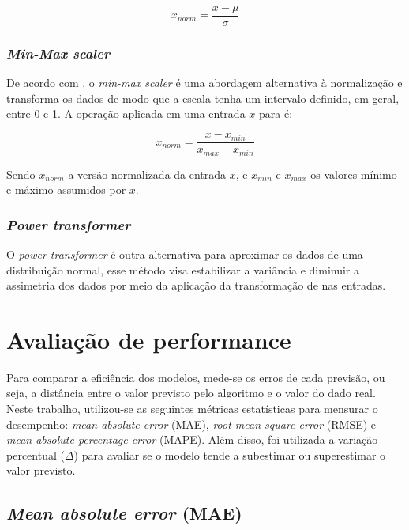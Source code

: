\begin{equation}
  x_{norm} = \frac{x - \mu}{\sigma}
\end{equation}

\subsubsection{\textit{Min-Max scaler}}

De acordo com \citet{Raschka}, o \textit{min-max scaler} é uma 
abordagem alternativa à normalização 
e transforma os dados de modo que a 
escala tenha um intervalo definido, em geral, entre
0 e 1. A operação aplicada em uma entrada $x$ para é:

\begin{equation}
  x_{norm} = \frac{x - x_{min}}{x_{max} - x_{min}}
\end{equation}

Sendo $x_{norm}$ a versão normalizada da entrada $x$, e $x_{min}$ e $x_{max}$
os valores mínimo e máximo assumidos por $x$. 

\subsubsection{\textit{Power transformer}}

O \textit{power transformer} é outra alternativa para aproximar os dados 
de uma distribuição normal, esse método visa estabilizar a variância e 
diminuir a assimetria dos dados por meio da aplicação da 
transformação de \citet{yeo} nas entradas. 


\section{Avaliação de performance}

Para comparar a eficiência dos modelos, mede-se os erros de 
cada previsão, ou seja, a distância entre o valor previsto 
pelo algoritmo e o valor do dado real. Neste trabalho, 
utilizou-se as seguintes métricas estatísticas para 
mensurar o desempenho: \textit{mean absolute error} (MAE),
\textit{root mean square  error} (RMSE) e \textit{mean 
absolute percentage error} (MAPE). Além disso, foi utilizada
a variação percentual ($\Delta$) para avaliar se o modelo tende 
a subestimar ou superestimar o valor previsto.

\subsection{\textit{Mean absolute error} (MAE)}

